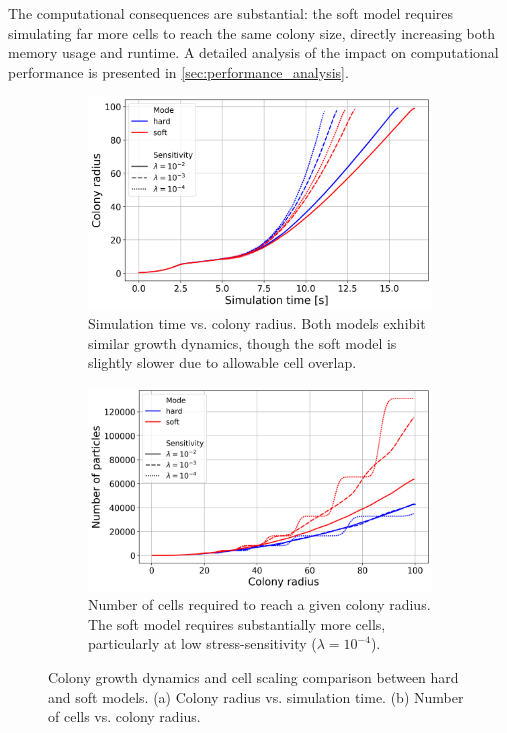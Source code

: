 \documentclass[conference]{IEEEtran}
\begin{document}
The computational consequences are substantial: the soft model requires simulating far more cells to reach the same colony size, directly increasing both memory usage and runtime. A detailed analysis of the impact on computational performance is presented in \autoref{sec:performance_analysis}.

\begin{figure}[h]
    \centering
    \begin{subfigure}[b]{\linewidth}
        \centering
        \includegraphics[width=\linewidth]{figures/comparison_plots/combined_simulation_time [s]_vs_colony_radius.png}
        \caption{Simulation time vs. colony radius. Both models exhibit similar growth dynamics, though the soft model is slightly slower due to allowable cell overlap.}
        \label{fig:sim_time_vs_colony_radius}
    \end{subfigure}

    \begin{subfigure}[b]{\linewidth}
        \centering
        \includegraphics[width=\linewidth]{figures/comparison_plots/combined_colony_radius_vs_num_particles.png}
        \caption{Number of cells required to reach a given colony radius. The soft model requires substantially more cells, particularly at low stress-sensitivity ($\lambda = 10^{-4}$).}
        \label{fig:colony_radius_vs_num_cells}
    \end{subfigure}

    \caption{Colony growth dynamics and cell scaling comparison between hard and soft models. (a) Colony radius vs. simulation time. (b) Number of cells vs. colony radius.}
    \label{fig:comparison_combined}
\end{figure}
\end{document}

